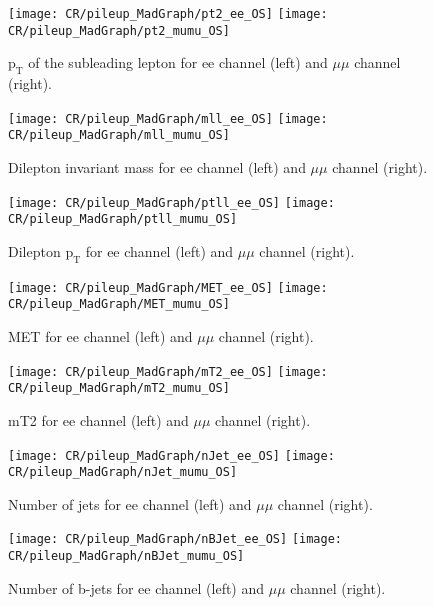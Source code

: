 \begin{figure}
\texttt{[image: CR/pileup\_MadGraph/pt2\_ee\_OS]}
\texttt{[image: CR/pileup\_MadGraph/pt2\_mumu\_OS]}
\caption{$\text{p}_{\text{T}}$ of the subleading lepton for ee channel (left) and $\mu\mu$ channel (right).}
\end{figure}

\begin{figure}
\texttt{[image: CR/pileup\_MadGraph/mll\_ee\_OS]}
\texttt{[image: CR/pileup\_MadGraph/mll\_mumu\_OS]}
\caption{Dilepton invariant mass for ee channel (left) and $\mu\mu$ channel (right).}
\end{figure}

\begin{figure}
\texttt{[image: CR/pileup\_MadGraph/ptll\_ee\_OS]}
\texttt{[image: CR/pileup\_MadGraph/ptll\_mumu\_OS]}
\caption{Dilepton $\text{p}_{\text{T}}$ for ee channel (left) and $\mu\mu$ channel (right).}
\end{figure}

\begin{figure}
\texttt{[image: CR/pileup\_MadGraph/MET\_ee\_OS]}
\texttt{[image: CR/pileup\_MadGraph/MET\_mumu\_OS]}
\caption{MET for ee channel (left) and $\mu\mu$ channel (right).}
\end{figure}

\begin{figure}
\texttt{[image: CR/pileup\_MadGraph/mT2\_ee\_OS]}
\texttt{[image: CR/pileup\_MadGraph/mT2\_mumu\_OS]}
\caption{mT2 for ee channel (left) and $\mu\mu$ channel (right).}
\end{figure}

\begin{figure}
\texttt{[image: CR/pileup\_MadGraph/nJet\_ee\_OS]}
\texttt{[image: CR/pileup\_MadGraph/nJet\_mumu\_OS]}
\caption{Number of jets for ee channel (left) and $\mu\mu$ channel (right).}
\end{figure}

\begin{figure}
\texttt{[image: CR/pileup\_MadGraph/nBJet\_ee\_OS]}
\texttt{[image: CR/pileup\_MadGraph/nBJet\_mumu\_OS]}
\caption{Number of b-jets for ee channel (left) and $\mu\mu$ channel (right).}
\label{pileup_MadGraph_end}
\end{figure}

